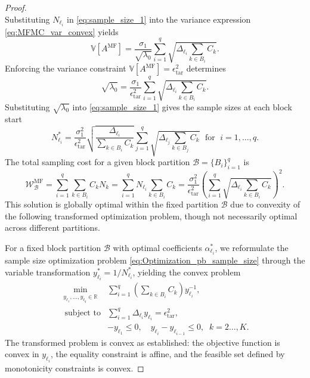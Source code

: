 \begin{proof}
\begin{equation}
\end{equation}
%
Substituting $N_{\ell_i}$ in \eqref{eq:sample_size_1} into the variance expression \eqref{eq:MFMC_var_convex} yields
%
\begin{equation*} \label{eq:MFMC_variance2}
    \mathbb{V}\left[A^{\text{MF}}\right] = \frac{\sigma_1}{\sqrt{\lambda_0}}\sum_{i=1}^q\sqrt{\Delta_{\ell_i}\sum_{k\in B_i} C_k}.
\end{equation*}
%
Enforcing the variance constraint $\mathbb{V}[A^{\text{MF}}] = \epsilon_{\text{tar}}^2$ determines 
%
\[
\sqrt{\lambda_0}=\frac{\sigma_1}{\epsilon_{\text{tar}}^2} \sum_{i=1}^{q} \sqrt{\Delta_{\ell_i}\sum_{k\in B_i} C_{k}}.
\]
%
Substituting $\sqrt{\lambda_0}$ into \eqref{eq:sample_size_1} gives the sample sizes at each block start
%
\[
N_{\ell_i}^* = \frac{\sigma_1^2}{\epsilon_{\text{tar}}^2}\sqrt{\frac{\Delta_{\ell_i}}{\sum_{k\in B_i} C_{k}}}  \sum_{j=1}^{q} \sqrt{\Delta_{\ell_j}\sum_{k\in B_j} C_{k}} \;\text{ for }\; i=1,\ldots,q.
\]
%
The total sampling cost for a given block partition $\mathscr{B} = \{B_i\}_{i=1}^q$ is
%
\begin{equation*}
\mathcal{W}_{\mathscr{B}}^{\text{MF}} = \sum_{i=1}^q \sum_{k\in B_i} C_k N_k = \sum_{i=1}^q N_{\ell_i}\sum_{k\in B_i} C_k =\frac{\sigma_1^2}{\epsilon_{\text{tar}}^2}\left(\sum_{i=1}^{q} \sqrt{\Delta_{\ell_i}\sum_{k\in B_i} C_{k}}\right)^2.
\end{equation*}
%
This solution is globally optimal within the fixed partition $\mathscr{B}$ due to convexity of the following transformed optimization problem, though not necessarily optimal across different  partitions.

\medskip
{}

For a fixed block partition $\mathscr{B}$ with optimal coefficients $\alpha_{\ell_i}^*$, we reformulate the sample size optimization problem \eqref{eq:Optimization_pb_sample_size} through the variable transformation $y_{\ell_i}^* = 1/N_{\ell_i}^*$, yielding the convex problem
%
\begin{equation}\label{eq:Optimization_pb_sample_size3}
    \begin{array}{ll}
    \min \limits_{\begin{array}{c}\scriptstyle y_{\ell_1},\ldots, y_{\ell_q}\in \mathbb{R}
\end{array}} &\displaystyle \sum_{i=1}^q \left(\sum_{k\in B_i}C_{k}\right)y_{\ell_i}^{-1},\\
       \;\,\text{subject to} &\displaystyle \sum_{i=1}^q \Delta_{\ell_i} y_{\ell_i}= \epsilon_{\text{tar}}^2,\\[2pt]
       &\displaystyle -y_{\ell_1}\le 0,\quad \displaystyle y_{\ell_i}-y_{\ell_{i-1}}\le 0, \;\; k=2\ldots,K.
    \end{array}
\end{equation}
%
The transformed problem is convex as established: the objective function is convex in $y_{\ell_i}$, the equality constraint is affine, and the feasible set defined by monotonicity constraints is convex.  


\end{proof}
